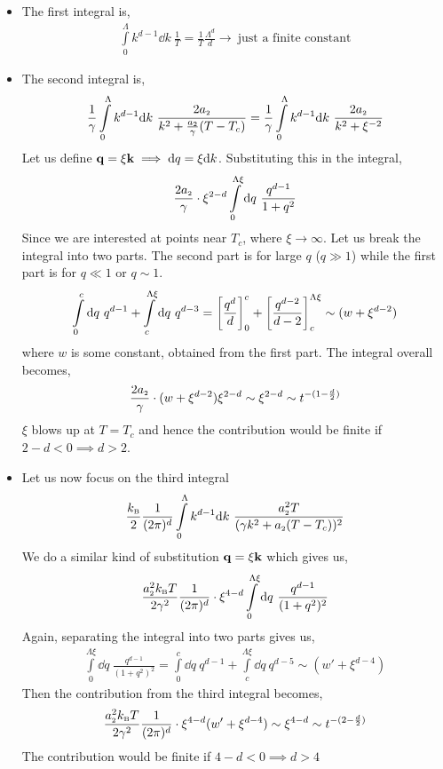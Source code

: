 \begin{itemize}
    \item The first integral is, 
    \begin{align*}
        \int\limits_0^\Lambda k^{d-1}\dd k \ \frac{1}{T} = \frac{1}{T}\frac{\Lambda^d}{d}\longrightarrow \ \text{just a finite constant}
    \end{align*}
    \item The second integral is, 
    \begin{align*}
      \frac{1}{\gamma} \int\limits_0^\Lambda k^{d-1}\dd k \  \frac{2a_{\text{\tiny 2}}}{ k^2+\frac{a_{\text{\tiny 2}}}{\gamma}(T-T_c)} =  \frac{1}{\gamma} \int\limits_0^\Lambda k^{d-1}\dd k \  \frac{2a_{\text{\tiny 2}}}{ k^2+\xi^{-2}}
    \end{align*}
    Let us define $\vb{q} = \xi \vb{k}\implies \dd q = \xi \dd k$. Substituting this in the integral, 
    \begin{align*}
    \frac{2a_{\text{\tiny 2}}}{\gamma}\cdot \xi^{2-d} \int\limits_0^{\Lambda \xi} \dd q \  \frac{q^{d-1}}{1+q^2}
    \end{align*}
    Since we are interested at points near $T_c$, where $\xi\to \infty$. Let us break the integral into two parts. The second part is for large $q$ ($q\gg 1$) while the first part is for $q\ll 1$ or $q\sim 1$. 
    \begin{align*}
    \int\limits_0^{ c} \dd q \ q^{d-1} +  \int\limits_c^{ \Lambda \xi} \dd q \  q^{d-3}= \qty[\frac{q^d}{d}]_0^c+ \qty[\frac{q^{d-2}}{d-2}]_c^{\Lambda \xi} \sim (w+\xi^{d-2})
    \end{align*}
    where $w$ is some constant, obtained from the first part. The integral overall becomes, 
    $$\frac{2a_{\text{\tiny 2}}}{\gamma}\cdot (w+\xi^{d-2}) \xi^{2-d} \sim \xi^{2-d}\sim t^{-(1-\frac{d}{2})}$$
    $\xi$ blows up at $T=T_c$ and hence the contribution would be finite if $2-d<0 \implies d>2$.
    \item Let us now focus on the third integral
    \begin{align*}
        \frac{k_{\text{\tiny B}}}{2}\frac{1}{(2\pi)^d}\int\limits_0^\Lambda k^{d-1}\dd k  \ \frac{a_{\text{\tiny 2}}^2T}{(\gamma k^2 +a_{\text{\tiny 2}}(T-T_c))^2}
    \end{align*}
    We do a similar kind of substitution $\vb{q} = \xi \vb{k}$ which gives us, 
   \begin{align*}
        \frac{ a_{\text{\tiny 2}}^2 k_{\text{\tiny B}} T}{2\gamma^2}\frac{1}{(2\pi)^d}\cdot \xi^{4-d}\int\limits_0^{\Lambda \xi}\dd q  \ \frac{q^{d-1}}{(1+q^2)^2}
    \end{align*}
    Again, separating the integral into two parts gives us, 
    \begin{align*}
        \int\limits_0^{\Lambda \xi}\dd q  \ \frac{q^{d-1}}{(1+q^2)^2} =\int\limits_0^{c}\dd q  \ {q^{d-1}}+\int\limits_c^{\Lambda \xi}\dd q  \ {q^{d-5}} \sim (w' + \xi^{d-4})
    \end{align*}
    Then the contribution from the third integral becomes, 
    \begin{align*}
        \frac{ a_{\text{\tiny 2}}^2 k_{\text{\tiny B}} T}{2\gamma^2}\frac{1}{(2\pi)^d}\cdot \xi^{4-d}(w'+\xi^{d-4}) \sim \xi^{4-d} \sim t^{-(2-\frac{d}{2})}
    \end{align*}
    The contribution would be finite if $4-d<0\implies d>4$
\end{itemize}
